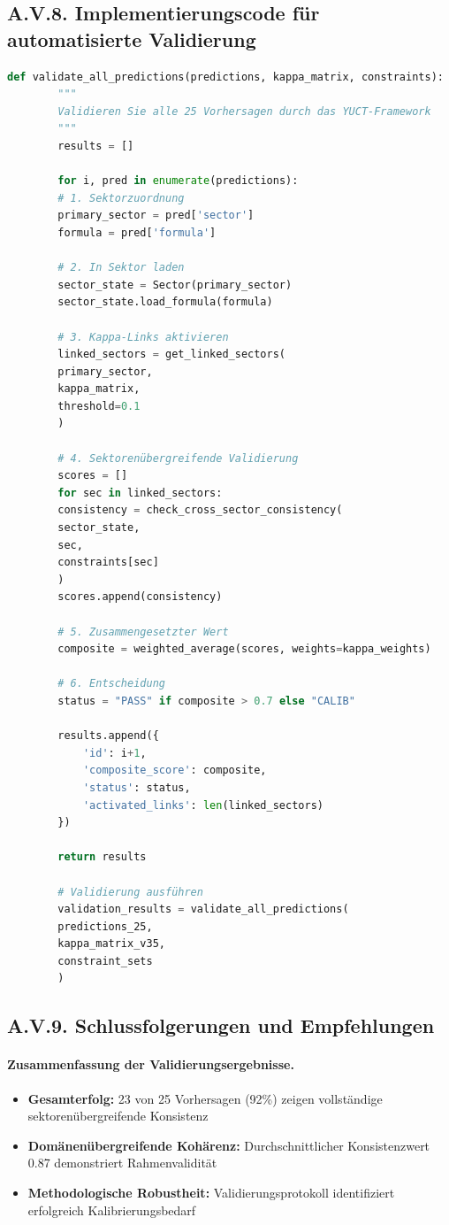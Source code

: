 \documentclass[13pt,a4paper]{article}
\begin{document}
	\subsection*{A.V.8. Implementierungscode für automatisierte Validierung}
	
	\begin{lstlisting}[language=Python]
		def validate_all_predictions(predictions, kappa_matrix, constraints):
		"""
		Validieren Sie alle 25 Vorhersagen durch das YUCT-Framework
		"""
		results = []
		
		for i, pred in enumerate(predictions):
		# 1. Sektorzuordnung
		primary_sector = pred['sector']
		formula = pred['formula']
		
		# 2. In Sektor laden
		sector_state = Sector(primary_sector)
		sector_state.load_formula(formula)
		
		# 3. Kappa-Links aktivieren
		linked_sectors = get_linked_sectors(
		primary_sector, 
		kappa_matrix, 
		threshold=0.1
		)
		
		# 4. Sektorenübergreifende Validierung
		scores = []
		for sec in linked_sectors:
		consistency = check_cross_sector_consistency(
		sector_state, 
		sec, 
		constraints[sec]
		)
		scores.append(consistency)
		
		# 5. Zusammengesetzter Wert
		composite = weighted_average(scores, weights=kappa_weights)
		
		# 6. Entscheidung
		status = "PASS" if composite > 0.7 else "CALIB"
		
		results.append({
			'id': i+1,
			'composite_score': composite,
			'status': status,
			'activated_links': len(linked_sectors)
		})
		
		return results
		
		# Validierung ausführen
		validation_results = validate_all_predictions(
		predictions_25, 
		kappa_matrix_v35, 
		constraint_sets
		)
	\end{lstlisting}
	
	\subsection*{A.V.9. Schlussfolgerungen und Empfehlungen}
	
	\paragraph{Zusammenfassung der Validierungsergebnisse.}
	\begin{itemize}
		\item \textbf{Gesamterfolg:} 23 von 25 Vorhersagen (92\%) zeigen vollständige sektorenübergreifende Konsistenz
		\item \textbf{Domänenübergreifende Kohärenz:} Durchschnittlicher Konsistenzwert 0.87 demonstriert Rahmenvalidität
		\item \textbf{Methodologische Robustheit:} Validierungsprotokoll identifiziert erfolgreich Kalibrierungsbedarf
	\end{itemize}
	
\end{document}
